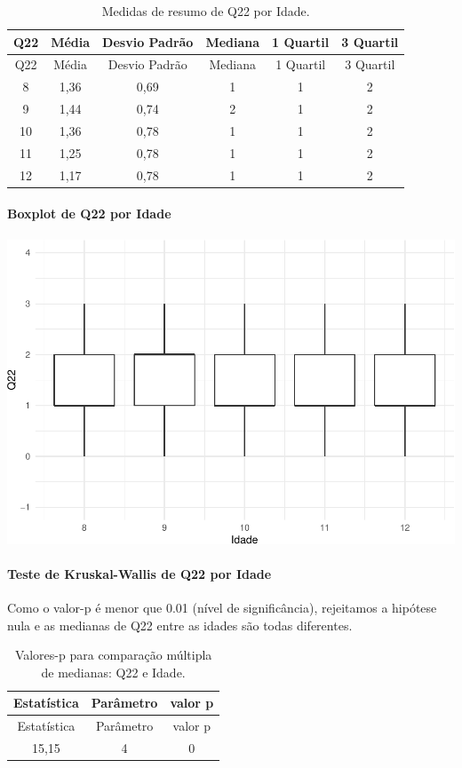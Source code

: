\documentclass[]{article}
\let\oldparagraph\paragraph
\renewcommand{\paragraph}[1]{\oldparagraph{#1}\mbox{}}
\begin{document}
\begin{longtable}[]{@{}cccccc@{}}
\caption{\label{tab:unnamed-chunk-509}Medidas de resumo de Q22 por Idade.}\tabularnewline
\toprule
Q22 & Média & Desvio Padrão & Mediana & 1 Quartil & 3 Quartil\tabularnewline
\midrule
\endfirsthead
\toprule
Q22 & Média & Desvio Padrão & Mediana & 1 Quartil & 3 Quartil\tabularnewline
\midrule
\endhead
8 & 1,36 & 0,69 & 1 & 1 & 2\tabularnewline
9 & 1,44 & 0,74 & 2 & 1 & 2\tabularnewline
10 & 1,36 & 0,78 & 1 & 1 & 2\tabularnewline
11 & 1,25 & 0,78 & 1 & 1 & 2\tabularnewline
12 & 1,17 & 0,78 & 1 & 1 & 2\tabularnewline
\bottomrule
\end{longtable}

\hypertarget{boxplot-de-q22-por-idade}{%
\paragraph{Boxplot de Q22 por Idade}\label{boxplot-de-q22-por-idade}}

\begin{center}\includegraphics[width=0.75\linewidth]{relatorio_covid19_files/figure-latex/unnamed-chunk-510-1} \end{center}

\hypertarget{teste-de-kruskal-wallis-de-q22-por-idade}{%
\paragraph{Teste de Kruskal-Wallis de Q22 por Idade}\label{teste-de-kruskal-wallis-de-q22-por-idade}}

Como o valor-p é menor que 0.01 (nível de significância), rejeitamos a hipótese nula e as medianas de Q22 entre as idades são todas diferentes.

\begin{longtable}[]{@{}ccc@{}}
\caption{\label{tab:unnamed-chunk-512}Valores-p para comparação múltipla de medianas: Q22 e Idade.}\tabularnewline
\toprule
Estatística & Parâmetro & valor p\tabularnewline
\midrule
\endfirsthead
\toprule
Estatística & Parâmetro & valor p\tabularnewline
\midrule
\endhead
15,15 & 4 & 0\tabularnewline
\bottomrule
\end{longtable}
\end{document}
